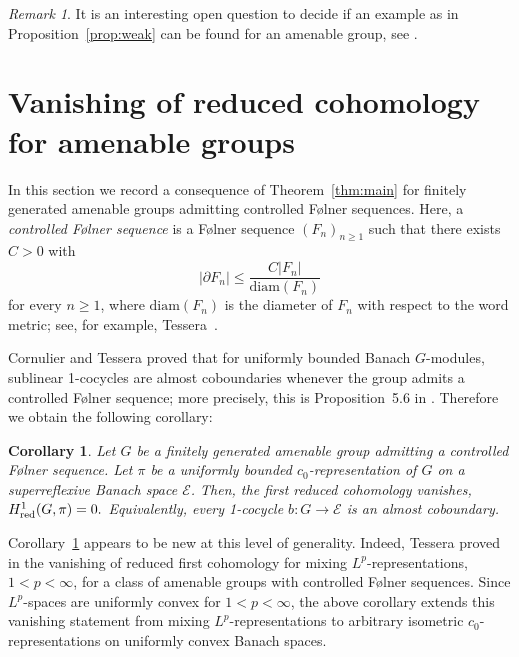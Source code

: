 \documentclass[a4paper,11pt]{amsproc}
\newtheorem{corollary}[theorem]{Corollary}
\theoremstyle{remark}
\newtheorem{remark}[theorem]{Remark}
\newcommand{\cE}{\mathcal E}
\begin{document}
\begin{remark}
It is an interesting open question to decide if an example as in Proposition~\ref{prop:weak} can be found for an amenable group, see \cite{CS15,CTV07,Oz18}.
\end{remark}

\section{Vanishing of reduced cohomology for amenable groups}

In this section we record a consequence of Theorem~\ref{thm:main} for finitely generated amenable groups admitting controlled Følner sequences. Here, a \emph{controlled Følner sequence} is a Følner sequence $(F_n)_{n\ge 1}$ such that there exists $C>0$ with 
$$|\partial F_n|\le \frac{C |F_n|}{\mathrm{diam}(F_n)}$$ for every $n\ge 1$, where $\mathrm{diam}(F_n)$ is the diameter of $F_n$ with respect to the word metric; see, for example, Tessera~\cite{Tess09}.

Cornulier and Tessera proved that for uniformly bounded Banach $G$-modules, sublinear 1-cocycles are almost coboundaries whenever the group admits a controlled Følner sequence; more precisely, this is Proposition~5.6 in \cite{CoTe20}. Therefore we obtain the following corollary:

\begin{corollary}\label{cor:reducedcohozero}
Let $G$ be a finitely generated amenable group admitting a controlled Følner sequence. Let $\pi$ be a uniformly bounded $c_0$-representation of $G$ on a superreflexive Banach space $\cE$. Then, the first reduced cohomology vanishes, $H^1_{\rm red}(G,\pi)=0.$ Equivalently, every 1-cocycle $b \colon G \to \cE$ is an almost coboundary.
\end{corollary}


Corollary~\ref{cor:reducedcohozero} appears to be new at this level of generality. Indeed, Tessera proved in \cite{Tess09} the vanishing of reduced first cohomology for mixing $L^p$-representations, $1<p<\infty$, for a class of amenable groups with controlled Følner sequences. Since $L^p$-spaces are uniformly convex for $1<p<\infty$, the above corollary extends this vanishing statement from mixing $L^p$-representations to arbitrary isometric $c_0$-representations on uniformly convex Banach spaces.
\end{document}

